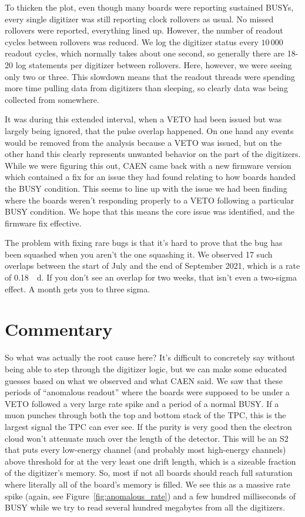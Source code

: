 To thicken the plot, even though many boards were reporting sustained BUSYs, every single digitizer was still reporting clock rollovers as usual.
No missed rollovers were reported, everything lined up.
However, the number of readout cycles between rollovers was reduced.
We log the digitizer status every $10\,000$ readout cycles, which normally takes about one second, so generally there are 18-20 log statements per digitizer between rollovers.
Here, however, we were seeing only two or three.
This slowdown means that the readout threads were spending more time pulling data from digitizers than sleeping, so clearly data was being collected from somewhere.

It was during this extended interval, when a VETO had been issued but was largely being ignored, that the pulse overlap happened.
On one hand any events would be removed from the analysis because a VETO was issued, but on the other hand this clearly represents unwanted behavior on the part of the digitizers.
While we were figuring this out, CAEN came back with a new firmware version which contained a fix for an issue they had found relating to how boards handed the BUSY condition.
This seems to line up with the issue we had been finding where the boards weren't responding properly to a VETO following a particular BUSY condition.
We hope that this means the core issue was identified, and the firmware fix effective.

The problem with fixing rare bugs is that it's hard to prove that the bug has been squashed when you aren't the one squashing it.
We observed 17 such overlaps between the start of July and the end of September 2021, which is a rate of \SI{0.18}{\per\day}.
If you don't see an overlap for two weeks, that isn't even a two-sigma effect.
A month gets you to three sigma.

\section{Commentary}

So what was actually the root cause here?
It's difficult to concretely say without being able to step through the digitizer logic, but we can make some educated guesses based on what we observed and what CAEN said.
We saw that these periods of ``anomalous readout'' where the boards were supposed to be under a VETO followed a very large rate spike and a period of a normal BUSY.
If a muon punches through both the top and bottom stack of the TPC, this is the largest signal the TPC can ever see.
If the purity is very good then the electron cloud won't attenuate much over the length of the detector.
This will be an S2 that puts every low-energy channel (and probably most high-energy channels) above threshold for at the very least one drift length, which is a sizeable fraction of the digitizer's memory.
So, most if not all boards should reach full saturation where literally all of the board's memory is filled.
We see this as a massive rate spike (again, see Figure~\ref{fig:anomalous_rate}) and a few hundred milliseconds of BUSY while we try to read several hundred megabytes from all the digitizers.

